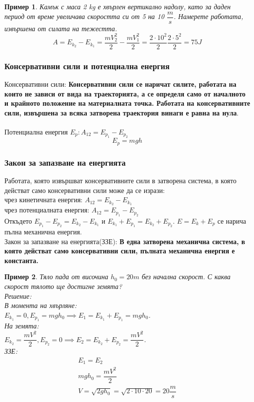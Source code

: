 \documentclass[fleqn, 12pt]{article}
\newtheorem{example}{Пример}[subsection]
\begin{document}
\begin{example}
Камък с маса 2 kg е хвърлен вертикално надолу, като за даден период от време увеличава скоростта си от 5 на 10 $\dfrac{m}{s}$. Намерете работата, извършена от силата на тежестта.
$$A = E_{k_2} - E_{k_1} = \dfrac{mV_2^2}{2} - \dfrac{mV_1^2}{2} = \dfrac{2 \cdot 10^2}{2} \dfrac{2 \cdot 5^2}{2} = 75J$$
\end{example}

\subsubsection{Консервативни сили и потенциална енергия}

Консервативни сили: \textbf{Консервативни сили се наричат силите, работата на които не зависи от вида на траекторията, а се определя само от началното и крайното положение на материалната точка. Работата на консервативните сили, извършена за всяка затворена траектория винаги е равна на нула}. \\
\\
Потенциална енергия $E_p: A_{12} = E_{p_1} - E_{p_2}$
$$E_p = mgh$$

\subsubsection{Закон за запазване на енергията}
Работата, която извършват консервативните сили в затворена система, в която действат само консервативни сили може да се изрази:\\
чрез кинетичната енергия: $A_{12} = E_{k_2} - E_{k_1}$ \\
чрез потенциалната енергия: $A_{12} = E_{p_1} - E_{p_2}$ \\
Откъдето $E_{p_1} - E_{p_2} = E_{k_2} - E_{k_1}$ и $E_{k_1} + E_{p_1} = E_{k_2} + E_{p_2} $. $E = E_k + E_p$ се нарича пълна механична енергия. \\
Закон за запазване на енергията(ЗЗЕ): \textbf{В една затворена механична система, в която действат само консервативни сили, пълната механична енергия е константа.}

\begin{example}
Тяло пада от височина $h_0 = 20m$ без начална скорост. С каква скорост тялото ще достигне земята? \\
Решение:\\
В момента на хвърляне: \\
$E_{k_1} = 0, E_{p_1} = mgh_0 \implies E_1 = E_{k_1} + E_{p_1} = mgh_0$. \\
На земята: \\
$E_{k_2} = \dfrac{mV^2}{2}, E_{p_2} = 0 \implies E_2 = E_{k_2} + E_{p_2} = \dfrac{mV^2}{2}$. \\
ЗЗЕ: 
\begin{gather*}
E_1 = E_2\\
mgh_0 = \dfrac{mV^2}{2}\\
V = \sqrt{2gh_0} = \sqrt{2\cdot 10 \cdot 20} = 20 \dfrac{m}{s}
\end{gather*}
\end{example}
\end{document}
